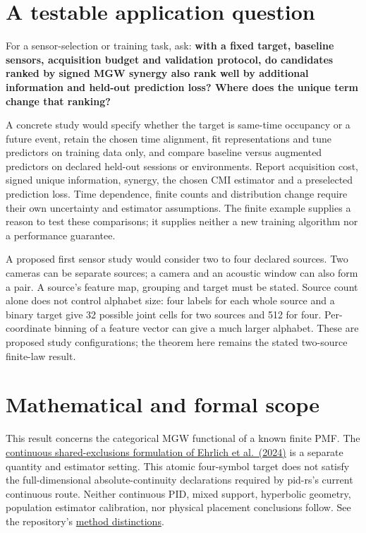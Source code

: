 \par{}

\section{A testable application question}\label{a-testable-application-question}

For a sensor-selection or training task, ask: \textbf{with a fixed target, baseline sensors, acquisition budget and validation protocol, do candidates ranked by signed MGW synergy also rank well by additional information and held-out prediction loss? Where does the unique term change that ranking?}

A concrete study would specify whether the target is same-time occupancy or a future event, retain the chosen time alignment, fit representations and tune predictors on training data only, and compare baseline versus augmented predictors on declared held-out sessions or environments. Report acquisition cost, signed unique information, synergy, the chosen CMI estimator and a preselected prediction loss. Time dependence, finite counts and distribution change require their own uncertainty and estimator assumptions. The finite example supplies a reason to test these comparisons; it supplies neither a new training algorithm nor a performance guarantee.

A proposed first sensor study would consider two to four declared sources. Two cameras can be separate sources; a camera and an acoustic window can also form a pair. A source's feature map, grouping and target must be stated. Source count alone does not control alphabet size: four labels for each whole source and a binary target give 32 possible joint cells for two sources and 512 for four. Per-coordinate binning of a feature vector can give a much larger alphabet. These are proposed study configurations; the theorem here remains the stated two-source finite-law result.

\par{}

\section{Mathematical and formal scope}\label{mathematical-and-formal-scope}

This result concerns the categorical MGW functional of a known finite PMF. The \href{https://doi.org/10.1103/PhysRevE.110.014115}{continuous shared-exclusions formulation of Ehrlich et al.~(2024)} is a separate quantity and estimator setting. This atomic four-symbol target does not satisfy the full-dimensional absolute-continuity declarations required by pid-rs's current continuous route. Neither continuous PID, mixed support, hyperbolic geometry, population estimator calibration, nor physical placement conclusions follow. See the repository's \href{https://github.com/sepahead/pid-rs/blob/main/METHODS.md}{method distinctions}.

